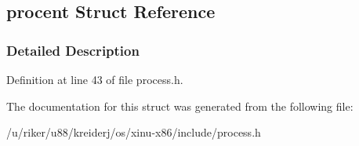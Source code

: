 \hypertarget{structprocent}{}\subsection{procent Struct Reference}
\label{structprocent}


\subsubsection{Detailed Description}


Definition at line 43 of file process.\+h.



The documentation for this struct was generated from the following file\+:\begin{DoxyCompactItemize}
\item 
/u/riker/u88/kreiderj/os/xinu-\/x86/include/process.\+h\end{DoxyCompactItemize}
